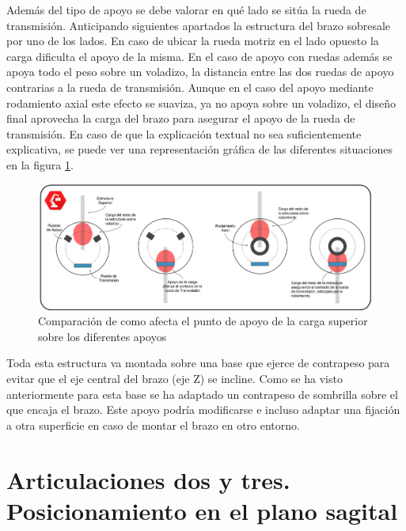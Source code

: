     Además del tipo de apoyo se debe valorar en qué lado se sitúa la rueda de transmisión. Anticipando siguientes apartados la estructura del brazo sobresale por uno de los lados. En caso de ubicar la rueda motriz en el lado opuesto la carga dificulta el apoyo de la misma. En el caso de apoyo con ruedas además se apoya todo el peso sobre un voladizo, la distancia entre las dos ruedas de apoyo contrarias a la rueda de transmisión. Aunque en el caso del apoyo mediante rodamiento axial este efecto se suaviza, ya no apoya sobre un voladizo, el diseño final aprovecha la carga del brazo para asegurar el apoyo de la rueda de transmisión. En caso de que la explicación textual no sea suficientemente explicativa, se puede ver una representación gráfica de las diferentes situaciones en la figura \ref{fig:Mecanica:apoyo_carga}.

    \begin{figure}[H]
        \centering
        \includegraphics[width=\textwidth]{figuras/Imagenes_Mecanica/comparacion_apoyos.jpg}
        \caption{Comparación de como afecta el punto de apoyo de la carga superior sobre los diferentes apoyos}
        \label{fig:Mecanica:apoyo_carga}
    \end{figure}

    Toda esta estructura va montada sobre una base que ejerce de contrapeso para evitar que el eje central del brazo (eje Z) se incline. Como se ha visto anteriormente para esta base se ha adaptado un contrapeso de sombrilla sobre el que encaja el brazo. Este apoyo podría modificarse e incluso adaptar una fijación a otra superficie en caso de montar el brazo en otro entorno.


\section{Articulaciones dos y tres. Posicionamiento en el plano sagital} \label{sec:Mecanica:articulacion_dostres}

